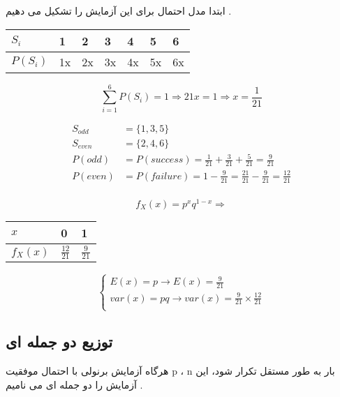\documentclass[12pt]{book}
\begin{document}
ابتدا مدل احتمال برای این آزمایش را تشکیل می دهیم .


\begin{center}
\begin{latin}
\begin{tabular}{ l | l  l  l  l  l  l }
  $S_{i}$ & 1 & 2 & 3 & 4  & 5 & 6 \\
  \hline
  $P(S_{i})$ & 1x & 2x & 3x & 4x  & 5x & 6x \\
\end{tabular}
\end{latin}
\end{center}

$$
\sum_{i=1}^{6}{P(S_{i})} = 1 \Rightarrow 21 x = 1 \Rightarrow x = \frac{1}{21}
$$



\begin{align*}
S_{odd} &= \{ 1 , 3 , 5 \} \\
S_{even} &= \{ 2 , 4 , 6 \} \\
P(odd) &= P(success) = \frac{1}{21} + \frac{3}{21} + \frac{5}{21} = \frac{9}{21} \\
P(even) &= P(failure) = 1 - \frac{9}{21} = \frac{21}{21} - \frac{9}{21} = \frac{12}{21} \\
\end{align*}


$$
f_{X}(x) = p^{x} q^{1-x} \Rightarrow
$$

\begin{center}
\begin{latin}
\begin{tabular}{ l |  l  l }
  $x$ & 0 & 1 \\
  \hline
  $f_{X}(x)$ & $\frac{12}{21}$ & $\frac{9}{21}$ \\
\end{tabular}
\end{latin}
\end{center}

$$
\begin{cases}
E(x) = p \to E(x) = \frac{9}{21} \\
var(x) = pq \to var(x) = \frac{9}{21} \times \frac{12}{21} \\
\end{cases}
$$



\subsection{توزیع دو جمله ای}
هرگاه آزمایش برنولی با احتمال موفقیت p ، 
n بار به طور مستقل تکرار شود، این آزمایش را دو جمله ای می نامیم .
\end{document}
